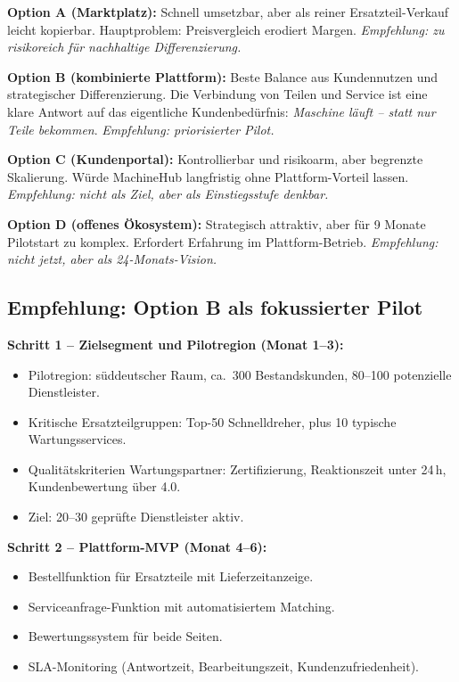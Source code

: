 \documentclass[11pt,a4paper,oneside]{article}
\begin{document}
\textbf{Option A (Marktplatz):} Schnell umsetzbar, aber als reiner Ersatzteil-Verkauf leicht kopierbar. Hauptproblem: Preisvergleich erodiert Margen. \emph{Empfehlung: zu risikoreich für nachhaltige Differenzierung.}

\textbf{Option B (kombinierte Plattform):} Beste Balance aus Kundennutzen und strategischer Differenzierung. Die Verbindung von Teilen und Service ist eine klare Antwort auf das eigentliche Kundenbedürfnis: \emph{Maschine läuft -- statt nur Teile bekommen}. \emph{Empfehlung: priorisierter Pilot.}

\textbf{Option C (Kundenportal):} Kontrollierbar und risikoarm, aber begrenzte Skalierung. Würde MachineHub langfristig ohne Plattform-Vorteil lassen. \emph{Empfehlung: nicht als Ziel, aber als Einstiegsstufe denkbar.}

\textbf{Option D (offenes Ökosystem):} Strategisch attraktiv, aber für 9 Monate Pilotstart zu komplex. Erfordert Erfahrung im Plattform-Betrieb. \emph{Empfehlung: nicht jetzt, aber als 24-Monats-Vision.}

\subsection{Empfehlung: Option B als fokussierter Pilot}

\textbf{Schritt 1 -- Zielsegment und Pilotregion (Monat 1--3):}
\begin{itemize}
  \item Pilotregion: süddeutscher Raum, ca.\ 300 Bestandskunden, 80--100 potenzielle Dienstleister.
  \item Kritische Ersatzteilgruppen: Top-50 Schnelldreher, plus 10 typische Wartungsservices.
  \item Qualitätskriterien Wartungspartner: Zertifizierung, Reaktionszeit unter 24\,h, Kundenbewertung über 4.0.
  \item Ziel: 20--30 geprüfte Dienstleister aktiv.
\end{itemize}

\textbf{Schritt 2 -- Plattform-MVP (Monat 4--6):}
\begin{itemize}
  \item Bestellfunktion für Ersatzteile mit Lieferzeitanzeige.
  \item Serviceanfrage-Funktion mit automatisiertem Matching.
  \item Bewertungssystem für beide Seiten.
  \item SLA-Monitoring (Antwortzeit, Bearbeitungszeit, Kundenzufriedenheit).
\end{itemize}
\end{document}
